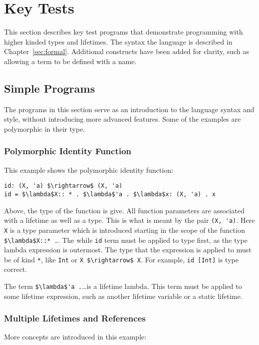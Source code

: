 \chapter{Key Tests}\label{sec:testing}

This section describes key test programs that demonstrate programming
with higher kinded types and lifetimes. The syntax the language is described
in Chapter~\ref{sec:formal}. Additional constructs have been added for clarity,
such as allowing a term to be defined with a name.

\section{Simple Programs}
The programs in this section serve as an introduction to the language syntax
and style, without introducing more advanced features. Some of the examples are
polymorphic in their type.

\subsection{Polymorphic Identity Function}
This example shows the polymorphic identity function:

\begin{lstlisting}[mathescape, caption={Identity function}, label={lst:id}]
id: (X, 'a) $\rightarrow$ (X, 'a)
id = $\lambda$X:: * . $\lambda$'a . $\lambda$x: (X, 'a) . x
\end{lstlisting}

Above, the type of the function is give. All function parameters are associated
with a lifetime as well as a type. This is what is meant by the pair
\lstinline[mathescape]{(X, 'a)}.  Here \lstinline{X} is a type parameter which
is introduced starting in the scope of the function
\lstinline[mathescape]{$\lambda$X::* .}. The while \lstinline{id} term must be
applied to type first, as the type lambda expression is outermost. The type
that the expression is applied to must be of kind \lstinline{*}, like
\lstinline{Int} or \lstinline[mathescape]{X $\rightarrow$ X}. For example,
\lstinline{id [Int]} is type correct. 

The term \lstinline[mathescape]{$\lambda$'a .}\ldots is a lifetime lambda.
This term must be applied to some lifetime expression, such as another lifetime
variable or a static lifetime.

\subsection{Multiple Lifetimes and References}
More concepts are introduced in this example:

